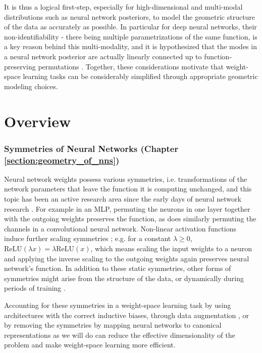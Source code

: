 It is thus a logical first-step, especially for high-dimensional and multi-modal distributions such as neural network posteriors, to model the geometric structure of the data as accurately as possible. In particular for deep neural networks, their non-identifiability - there being multiple parametrizations of the same function, is a key reason behind this multi-modality, and it is hypothesized that the modes in a neural network posterior are actually linearly connected up to function-preserving permutations \citep{entezariRolePermutationInvariance2022}. Together, these considerations motivate that weight-space learning tasks can be considerably simplified through appropriate geometric modeling choices. 


\section{Overview}

\subsubsection{Symmetries of Neural Networks (Chapter \ref{section:geometry_of_nns})}

Neural network weights possess various symmetries, i.e. transformations of the network parameters that leave the function it is computing unchanged, and this topic has been an active research area since the early days of neural network research \citep{hecht-nielsenALGEBRAICSTRUCTUREFEEDFORWARD1990}. For example in an MLP, permuting the neurons in one layer together with the outgoing weights preserves the function, as does similarly permuting the channels in a convolutional neural network. Non-linear activation functions induce further scaling symmetries \citep{godfreySymmetriesDeepLearning2022}; e.g. for a constant $\lambda \geq 0$, $\text{ReLU}(\lambda x) = \lambda \text{ReLU}(x)$, which means scaling the input weights to a neuron and applying the inverse scaling to the outgoing weights again preserves neural network's function. In addition to these static symmetries, other forms of symmetries might arise from the structure of the data, or dynamically during periods of training \citep{zhaoFindingSymmetryNeural2024}. 

Accounting for these symmetries in a weight-space learning task by using architectures with the correct inductive biases, through data augmentation \citep{shamsianImprovedGeneralizationWeight2024}, or by removing the symmetries by mapping neural networks to canonical representations \citep{pittorinoDeepNetworksToroids2022} as we will do can reduce the effective dimensionality of the problem and make weight-space learning more efficient. 

